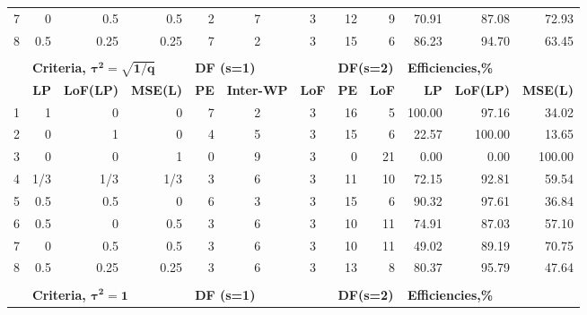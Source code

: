 \begin{table}[h]
{\begin{tabular}{rrrrcccrrrrr}
7 & 0    & 0.5  & 0.5  & \multicolumn{1}{|r}{2} & 7 & 3 & \multicolumn{1}{|r}{12} & 9  & \multicolumn{1}{|r}{70.91}  & 87.08  & 72.93  \\
8 & 0.5  & 0.25 & 0.25 & \multicolumn{1}{|r}{7} & 2 & 3 & \multicolumn{1}{|r}{15} & 6  & \multicolumn{1}{|r}{86.23}  & 94.70  & 63.45  \\
  &      &      &      &   &   &   &    &    &        &        &        \\  
   & \multicolumn{3}{l}{\textbf{Criteria, $\bm{\tau^2=\sqrt{1/q}}$}}    & \multicolumn{3}{l}{\textbf{DF (s=1)}} & \multicolumn{2}{l}{\textbf{DF(s=2)}} & \multicolumn{3}{l}{\textbf{Efficiencies,\%}}     \\
  & \textbf{LP} & \textbf{LoF(LP)} & \textbf{MSE(L)} & \textbf{PE} & \textbf{Inter-WP} & \textbf{LoF} & \textbf{PE}      & \textbf{LoF}      & \textbf{LP} & \textbf{LoF(LP)} & \textbf{MSE(L)} \\
1 & 1    & 0    & 0    & \multicolumn{1}{|r}{7} & 2 & 3 & \multicolumn{1}{|r}{16} & 5  & \multicolumn{1}{|r}{100.00} & 97.16  & 34.02  \\
2 & 0    & 1    & 0    & \multicolumn{1}{|r}{4} & 5 & 3 & \multicolumn{1}{|r}{15} & 6  & \multicolumn{1}{|r}{22.57}  & 100.00 & 13.65  \\
3 & 0    & 0    & 1    & \multicolumn{1}{|r}{0} & 9 & 3 & \multicolumn{1}{|r}{0}  & 21 & \multicolumn{1}{|r}{0.00}   & 0.00   & 100.00 \\
4 & 1/3 & 1/3 & 1/3    & \multicolumn{1}{|r}{3} & 6 & 3 & \multicolumn{1}{|r}{11} & 10 & \multicolumn{1}{|r}{72.15}  & 92.81  & 59.54  \\
5 & 0.5  & 0.5  & 0    & \multicolumn{1}{|r}{6} & 3 & 3 & \multicolumn{1}{|r}{15} & 6  & \multicolumn{1}{|r}{90.32}  & 97.61  & 36.84  \\
6 & 0.5  & 0    & 0.5  & \multicolumn{1}{|r}{3} & 6 & 3 & \multicolumn{1}{|r}{10} & 11 & \multicolumn{1}{|r}{74.91}  & 87.03  & 57.10  \\
7 & 0    & 0.5  & 0.5  & \multicolumn{1}{|r}{3} & 6 & 3 & \multicolumn{1}{|r}{10} & 11 & \multicolumn{1}{|r}{49.02}  & 89.19  & 70.75  \\
8 & 0.5  & 0.25 & 0.25 & \multicolumn{1}{|r}{3} & 6 & 3 & \multicolumn{1}{|r}{13} & 8  & \multicolumn{1}{|r}{80.37}  & 95.79  & 47.64 \\
  &      &      &      &   &   &   &    &    &        &        &        \\ 
 & \multicolumn{3}{l}{\textbf{Criteria, $\bm{\tau^2=1}$}}             & \multicolumn{3}{l}{\textbf{DF (s=1)}}          & \multicolumn{2}{l}{\textbf{DF(s=2)}} & \multicolumn{3}{l}{\textbf{Efficiencies,\%}}     \\

\end{tabular}}
\end{table}
